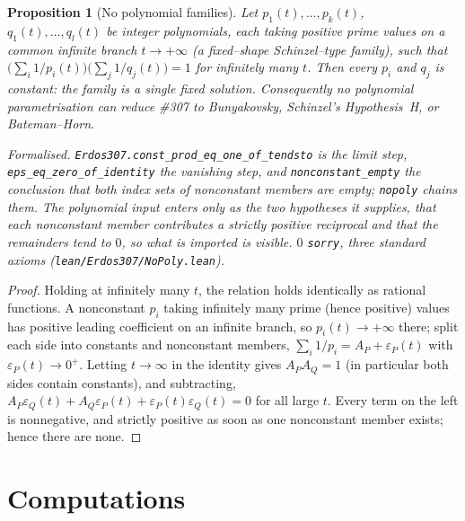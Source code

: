 \documentclass[11pt]{article}
\newtheorem{proposition}[theorem]{Proposition}
\theoremstyle{definition}
\begin{document}
\begin{proposition}[No polynomial families]\label{prop:nopoly}
Let $p_1(t),\dots,p_k(t)$, $q_1(t),\dots,q_l(t)$ be integer polynomials, each taking \emph{positive}
prime values on a common infinite branch $t\to+\infty$ (a fixed--shape Schinzel--type family), such
that
$\bigl(\sum_i1/p_i(t)\bigr)\bigl(\sum_j1/q_j(t)\bigr)=1$ for infinitely many $t$. Then every $p_i$ and
$q_j$ is constant: the family is a single fixed solution. Consequently no polynomial parametrisation can
reduce \#307 to Bunyakovsky, Schinzel's Hypothesis~H, or Bateman--Horn.

\textup{Formalised.} \texttt{Erdos307.const\_prod\_eq\_one\_of\_tendsto} is the limit step,
\texttt{eps\_eq\_zero\_of\_identity} the vanishing step, and \texttt{nonconstant\_empty} the
conclusion that both index sets of nonconstant members are empty; \texttt{nopoly} chains them. The
polynomial input enters only as the two hypotheses it supplies, that each nonconstant member
contributes a strictly positive reciprocal and that the remainders tend to $0$, so what is imported
is visible. $0$ \texttt{sorry}, three standard axioms
\textup{(\texttt{lean/Erdos307/NoPoly.lean})}.
\end{proposition}
\begin{proof}
Holding at infinitely many $t$, the relation holds identically as rational functions. A nonconstant
$p_i$ taking infinitely many prime (hence positive) values has positive leading coefficient on an
infinite branch, so $p_i(t)\to+\infty$ there; split each side into constants and nonconstant members,
$\sum_i1/p_i=A_P+\varepsilon_P(t)$ with $\varepsilon_P(t)\to0^+$. Letting $t\to\infty$ in the identity
gives $A_PA_Q=1$ (in particular both sides contain constants), and subtracting,
$A_P\varepsilon_Q(t)+A_Q\varepsilon_P(t)+\varepsilon_P(t)\varepsilon_Q(t)=0$ for all large $t$. Every
term on the left is nonnegative, and strictly positive as soon as one nonconstant member exists; hence
there are none.
\end{proof}

\section{Computations}\label{sec:computations}
\end{document}
